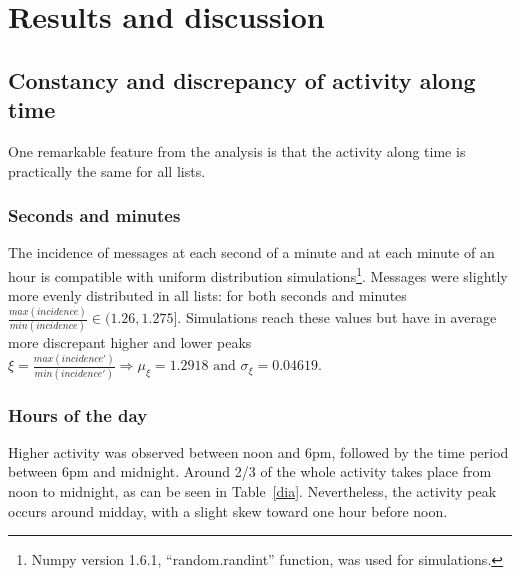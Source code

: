 \documentclass[%
 aip,
 jmp,%
 amsmath,amssymb,
 reprint,%
]{revtex4-1}
\begin{document}
%

\section{Results and discussion}

\subsection{Constancy and discrepancy of activity along time}\label{constDisc}
One remarkable feature from the analysis is that the activity along time is practically the same for all lists.

\subsubsection{Seconds and minutes}
The incidence of messages at each second of a minute and at each minute of an hour is compatible with uniform distribution simulations\footnote{Numpy version 1.6.1, ``random.randint'' function, was used for simulations.}. Messages were slightly more evenly distributed in all lists: for both seconds and minutes  $\frac{max(incidence)}{min(incidence)} \in (1.26,1.275]$. Simulations reach these values  but have in average more discrepant higher and lower peaks $\xi=\frac{max(incidence')}{min(incidence')} \Rightarrow \mu_\xi=1.2918 \text{ and } \sigma_\xi=0.04619$.

\subsubsection{Hours of the day}
Higher activity was observed between noon and 6pm, followed by the time period between 6pm and midnight. Around 2/3 of the whole activity takes place from noon to midnight, as can be seen in Table~\ref{dia}. Nevertheless, the activity peak occurs around midday, with a slight skew toward one hour before noon.
\end{document}
